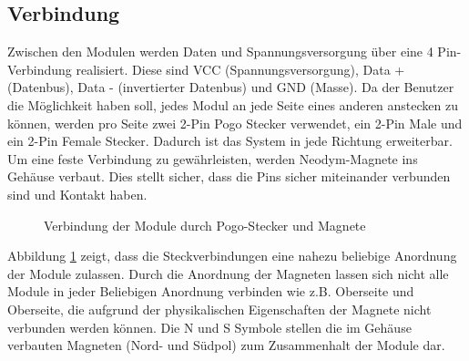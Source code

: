 \subsection{Verbindung}
Zwischen den Modulen werden Daten und Spannungsversorgung über eine 4 Pin-Verbindung realisiert. Diese sind VCC (Spannungsversorgung), Data + (Datenbus), Data - (invertierter Datenbus) und GND (Masse). Da der Benutzer die Möglichkeit haben soll, jedes Modul an jede Seite eines anderen anstecken zu können, werden pro Seite zwei 2-Pin Pogo Stecker verwendet, ein 2-Pin Male und ein 2-Pin Female Stecker. Dadurch ist das System in jede Richtung erweiterbar. Um eine feste Verbindung zu gewährleisten,  werden Neodym-Magnete ins Gehäuse verbaut. Dies stellt sicher, dass die Pins sicher miteinander verbunden sind und Kontakt haben. 
\begin{figure}[H]
    \centering    
    \caption{Verbindung der Module durch Pogo-Stecker und Magnete}
    \label{pogo_verbindung}
\end{figure}
 \noindent Abbildung \ref{pogo_verbindung} zeigt, dass die Steckverbindungen eine nahezu beliebige Anordnung der Module zulassen. Durch die Anordnung der Magneten lassen sich nicht alle Module in jeder Beliebigen Anordnung verbinden wie z.B. Oberseite und Oberseite, die aufgrund der physikalischen Eigenschaften der Magnete nicht verbunden werden können. Die \glqq N\grqq{} und \glqq S\grqq{} Symbole stellen die im Gehäuse verbauten Magneten (Nord- und Südpol) zum Zusammenhalt der Module dar.
 
